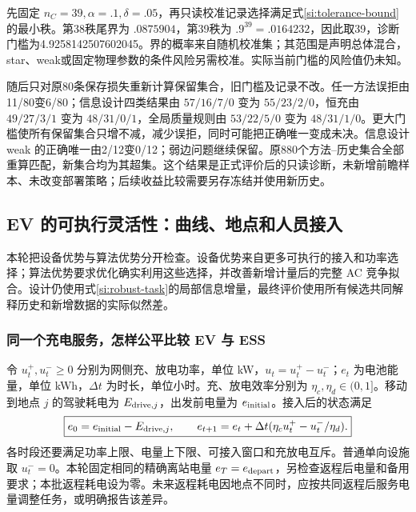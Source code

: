 \documentclass[UTF8,fontset=fandol,11pt,a4paper]{ctexart}
\begin{document}
先固定 $n_C=39,\alpha=.1,\delta=.05$，再只读校准记录选择满足式\eqref{si:tolerance-bound}的最小秩。第38秩尾界为 $.0875904$，第39秩为 $.9^{39}=.0164232$，因此取39，诊断门槛为4.9258142507602045。界的概率来自随机校准集；其范围是声明总体混合，star、weak或固定物理参数的条件风险另需校准。实际当前门槛的风险值仍未知。

随后只对原80条保存损失重新计算保留集合，旧门槛及记录不改。任一方法误拒由11/80变6/80；信息设计四类结果由 $57/16/7/0$ 变为 $55/23/2/0$，恒充由 $49/27/3/1$ 变为 $48/31/0/1$，全局质量规则由 $53/22/5/0$ 变为 $48/31/1/0$。更大门槛使所有保留集合只增不减，减少误拒，同时可能把正确唯一变成未决。信息设计 weak 的正确唯一由2/12变0/12；弱边问题继续保留。原880个方法--历史集合全部重算匹配，新集合均为其超集。这个结果是正式评价后的只读诊断，未新增前瞻样本、未改变部署策略；后续收益比较需要另存冻结并使用新历史。

\subsection{EV 的可执行灵活性：曲线、地点和人员接入}
\label{evf:flexibility}

本轮把设备优势与算法优势分开检查。设备优势来自更多可执行的接入和功率选择；算法优势要求优化确实利用这些选择，并改善新增计量后的完整 AC 竞争拟合。设计仍使用式\eqref{si:robust-task}的局部信息增量，最终评价使用所有候选共同解释历史和新增数据的实际似然差。

\subsubsection{同一个充电服务，怎样公平比较 EV 与 ESS}

令 $u_t^+,u_t^-\ge0$ 分别为网侧充、放电功率，单位 kW，$u_t=u_t^+-u_t^-$；$e_t$ 为电池能量，单位 kWh，$\Delta t$ 为时长，单位小时。充、放电效率分别为 $\eta_c,\eta_d\in(0,1]$。移动到地点 $j$ 的驾驶耗电为 $E_{{\rm drive},j}$，出发前电量为 $e_{\rm initial}$。接入后的状态满足
\begin{equation}
 \boxed{e_0=e_{\rm initial}-E_{{\rm drive},j},\qquad
 e_{t+1}=e_t+\Delta t(\eta_cu_t^+-u_t^-/\eta_d).}
 \label{evf:battery}
\end{equation}
各时段还要满足功率上限、电量上下限、可接入窗口和充放电互斥。普通单向设施取 $u_t^-=0$。本轮固定相同的精确离站电量 $e_T=e_{\rm depart}$，另检查返程后电量和备用要求；本批返程耗电设为零。未来返程耗电因地点不同时，应按共同返程后服务电量调整任务，或明确报告该差异。
\end{document}
